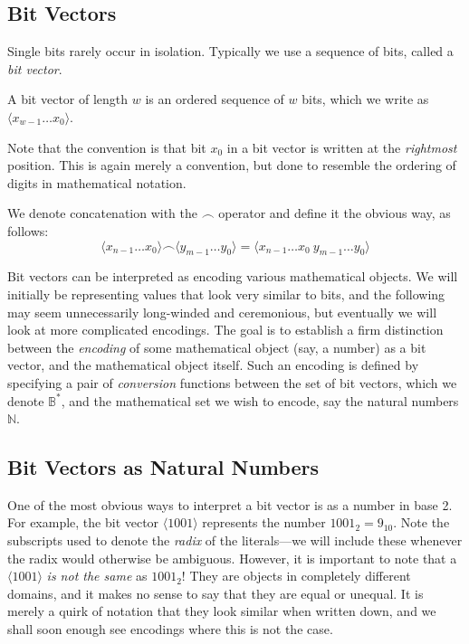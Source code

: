 \subsection{Bit Vectors}

\newcommand\bitvector[1]{\langle #1 \rangle}
\newcommand\bitconcat{\frown}

Single bits rarely occur in isolation.  Typically we use a sequence of
bits, called a \emph{bit vector}.

\begin{definition}
  A bit vector of length $w$ is an ordered sequence of $w$ bits, which
  we write as $\bitvector{x_{w-1}\ldots{}x_{0}}$.
\end{definition}

Note that the convention is that bit $x_{0}$ in a bit vector is
written at the \emph{rightmost} position.  This is again merely a
convention, but done to resemble the ordering of digits in
mathematical notation.

\begin{definition}
  We denote concatenation with the $\bitconcat$ operator and define it
  the obvious way, as follows:
  \[
    \bitvector{x_{n-1}\ldots{}x_{0}} \bitconcat \bitvector{y_{m-1}\ldots{}y_{0}} =
    \bitvector{x_{n-1}\ldots{}x_{0}~y_{m-1}\ldots{}y_{0}}
  \]
\end{definition}


Bit vectors can be interpreted as encoding various mathematical
objects.  We will initially be representing values that look very
similar to bits, and the following may seem unnecessarily long-winded
and ceremonious, but eventually we will look at more complicated
encodings.  The goal is to establish a firm distinction between the
\emph{encoding} of some mathematical object (say, a number) as a bit
vector, and the mathematical object itself.  Such an encoding is
defined by specifying a pair of \emph{conversion} functions between
the set of bit vectors, which we denote $\mathbb{B}^{*}$, and the
mathematical set we wish to encode, say the natural numbers
$\mathbb{N}$.

\subsection{Bit Vectors as Natural Numbers}
\label{sec:bitnats}

One of the most obvious ways to interpret a bit vector is as a number
in base 2.  For example, the bit vector $\bitvector{1001}$ represents
the number $1001_{2} = 9_{10}$.  Note the subscripts used to denote
the \emph{radix} of the literals---we will include these whenever the
radix would otherwise be ambiguous.  However, it is important to note
that a $\bitvector{1001}$ \emph{is not the same} as $1001_{2}$!  They
are objects in completely different domains, and it makes no sense to
say that they are equal or unequal.  It is merely a quirk of notation
that they look similar when written down, and we shall soon enough see
encodings where this is not the case.

